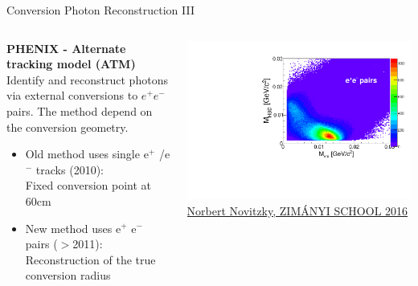 \documentclass[aspectratio=169,10pt]{beamer}
\begin{document}
  \begin{frame}{Conversion Photon Reconstruction III}
    \begin{columns}
      \vspace{-2.5cm}
      \begin{column}{10cm}  
        \textbf{PHENIX - Alternate tracking model (ATM)}\\
        Identify and reconstruct photons via external conversions to  $e^{+} e^{-}$ pairs. The method depend on the conversion geometry. 
          \begin{itemize}
           \item Old  method  uses  single  e$^{+}$ /e$^{-}$  tracks  (2010): \\
                  Fixed conversion point at 60cm  
           \item New  method uses e$^{+}$ e$^{-}$ pairs ($>$2011):  \\
                  Reconstruction  of  the true  conversion  radius  
          \end{itemize}
          \vspace{1cm}
      \end{column}
      \begin{column}{5.5cm}
         \vspace{-4cm}
         \includegraphics[width=\textwidth]{EMLectureWeek2018/InvMass2DPHENIX.pdf}\\
         \vspace{-4.2cm}
          \hspace{1.9cm} \tiny \href{https://indico.cern.ch/event/592683/contributions/2393877/attachments/1385932/2109026/NovitzkyZimanyi.pdf}{Norbert Novitzky, ZIMÁNYI SCHOOL 2016}\\

\end{column}
\end{columns}
\end{frame}
\end{document}
